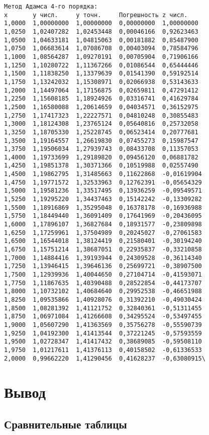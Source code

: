 \begin{verbatim}
Метод Адамса 4-го порядка:
x		y числ.		y точн.		Погрешность	z числ.
1,0000	1,00000000	1,00000000	0,00000000	1,00000000
1,0250	1,02407282	1,02453448	0,00046166	0,92623463
1,0500	1,04633181	1,04815063	0,00181882	0,85487900
1,0750	1,06683614	1,07086708	0,00403094	0,78584796
1,1000	1,08564287	1,09270191	0,00705904	0,71906166
1,1250	1,10280722	1,11367266	0,01086544	0,65444446
1,1500	1,11838250	1,13379639	0,01541390	0,59192514
1,1750	1,13242032	1,15308971	0,02066938	0,53143633
1,2000	1,14497064	1,17156875	0,02659811	0,47291412
1,2250	1,15608185	1,18924926	0,03316741	0,41629784
1,2500	1,16580088	1,20614659	0,04034571	0,36152975
1,2750	1,17417323	1,22227571	0,04810248	0,30855483
1,3000	1,18124308	1,23765124	0,05640816	0,25732058
1,3250	1,18705330	1,25228745	0,06523414	0,20777681
1,3500	1,19164557	1,26619830	0,07455273	0,15987547
1,3750	1,19506034	1,27939743	0,08433708	0,11357053
1,4000	1,19733699	1,29189820	0,09456120	0,06881782
1,4250	1,19851378	1,30371366	0,10519988	0,02557490
1,4500	1,19862795	1,31485663	0,11622868	-0,01619904
1,4750	1,19771572	1,32533963	0,12762391	-0,05654329
1,5000	1,19581236	1,33517495	0,13936259	-0,09549571
1,5250	1,19295220	1,34437463	0,15142242	-0,13309282
1,5500	1,18916869	1,35295048	0,16378178	-0,16936988
1,5750	1,18449440	1,36091409	0,17641969	-0,20436095
1,6000	1,17896107	1,36827684	0,18931577	-0,23809898
1,6250	1,17259961	1,37504989	0,20245027	-0,27061583
1,6500	1,16544018	1,38124419	0,21580401	-0,30194240
1,6750	1,15751214	1,38687051	0,22935837	-0,33210858
1,7000	1,14884416	1,39193944	0,24309528	-0,36114340
1,7250	1,13946415	1,39646136	0,25699721	-0,38907500
1,7500	1,12939936	1,40044650	0,27104714	-0,41593071
1,7750	1,11867635	1,40390488	0,28522854	-0,44173707
1,8000	1,10732102	1,40684640	0,29952538	-0,46651988
1,8250	1,09535866	1,40928076	0,31392210	-0,49030424
1,8500	1,08281392	1,41121752	0,32840361	-0,51311455
1,8750	1,06971084	1,41266608	0,34295524	-0,53497455
1,9000	1,05607290	1,41363569	0,35756278	-0,55590739
1,9250	1,04192300	1,41413544	0,37221245	-0,57593559
1,9500	1,02728347	1,41417432	0,38689085	-0,59508110
1,9750	1,01217611	1,41376113	0,40158502	-0,61336533
2,0000	0,99662220	1,41290456	0,41628237	-0,63080915\
\end{verbatim}

\section*{Вывод}

\subsection*{Сравнительные таблицы}

